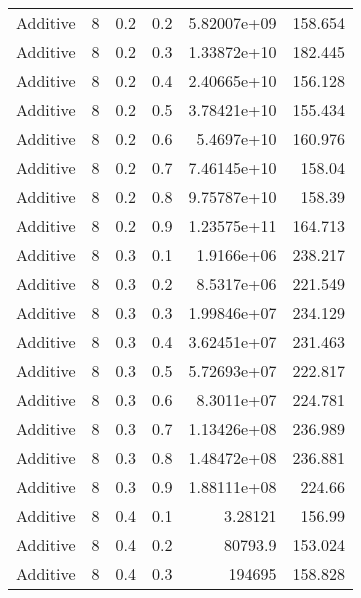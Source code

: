 \documentclass{article}
\begin{document}
\begin{longtable}[H]{lrrrrr}
 Additive       &       8 &   0.2 &            0.2 &      5.82007e+09 &        158.654  \\
 Additive       &       8 &   0.2 &            0.3 &      1.33872e+10 &        182.445  \\
 Additive       &       8 &   0.2 &            0.4 &      2.40665e+10 &        156.128  \\
 Additive       &       8 &   0.2 &            0.5 &      3.78421e+10 &        155.434  \\
 Additive       &       8 &   0.2 &            0.6 &      5.4697e+10  &        160.976  \\
 Additive       &       8 &   0.2 &            0.7 &      7.46145e+10 &        158.04   \\
 Additive       &       8 &   0.2 &            0.8 &      9.75787e+10 &        158.39   \\
 Additive       &       8 &   0.2 &            0.9 &      1.23575e+11 &        164.713  \\
 Additive       &       8 &   0.3 &            0.1 &      1.9166e+06  &        238.217  \\
 Additive       &       8 &   0.3 &            0.2 &      8.5317e+06  &        221.549  \\
 Additive       &       8 &   0.3 &            0.3 &      1.99846e+07 &        234.129  \\
 Additive       &       8 &   0.3 &            0.4 &      3.62451e+07 &        231.463  \\
 Additive       &       8 &   0.3 &            0.5 &      5.72693e+07 &        222.817  \\
 Additive       &       8 &   0.3 &            0.6 &      8.3011e+07  &        224.781  \\
 Additive       &       8 &   0.3 &            0.7 &      1.13426e+08 &        236.989  \\
 Additive       &       8 &   0.3 &            0.8 &      1.48472e+08 &        236.881  \\
 Additive       &       8 &   0.3 &            0.9 &      1.88111e+08 &        224.66   \\
 Additive       &       8 &   0.4 &            0.1 &      3.28121     &        156.99   \\
 Additive       &       8 &   0.4 &            0.2 &  80793.9         &        153.024  \\
 Additive       &       8 &   0.4 &            0.3 & 194695           &        158.828  \\

\end{longtable}
\end{document}
